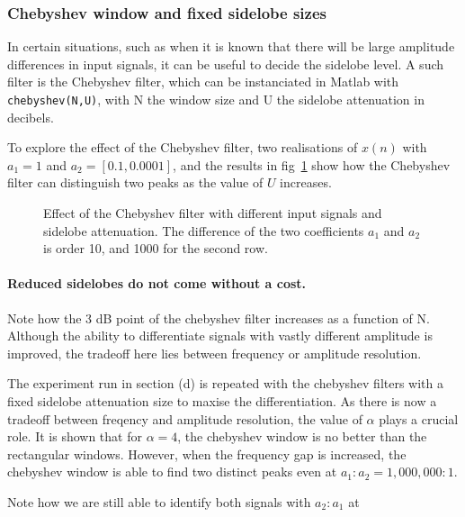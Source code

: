 \documentclass[main.tex]{subfiles}
\begin{document}
\subsubsection{Chebyshev window and fixed sidelobe sizes}

In certain situations, such as when it is known that there will be large amplitude differences in input signals, it can be useful to decide the sidelobe level. A such filter is the Chebyshev filter, which can be instanciated in Matlab with {\tt chebyshev(N,U)}, with N the window size and U the sidelobe attenuation in decibels.

To explore the effect of the Chebyshev filter, two realisations of $x(n)$ with $a_1 =1$ and $a_2=[0.1, 0.0001]$, and the results in fig~\ref{fig:q1_3_f} show how the Chebyshev filter can distinguish two peaks as the value of $U$ increases.

\begin{figure}[H]
	\centering 
	\resizebox{\textwidth}{!}{}
	\caption{Effect of the Chebyshev filter with different input signals and sidelobe attenuation. The difference of the two coefficients $a_1$ and $a_2$ is order 10, and 1000 for the second row.}
	\label{fig:q1_3_f}
\end{figure}

\paragraph{Reduced sidelobes do not come without a cost.} Note how the 3 dB point of the chebyshev filter increases as a function of N. Although the ability to differentiate signals with vastly different amplitude is improved, the tradeoff here lies between frequency or amplitude resolution.


The experiment run in section (d) is repeated with the chebyshev filters with a fixed sidelobe attenuation size to maxise the differentiation. As there is now a tradeoff between freqency and amplitude resolution, the value of $\alpha$ plays a crucial role. It is shown that for $\alpha = 4$, the chebyshev window is no better than the rectangular windows. However, when the frequency gap is increased, the chebyshev window is able to find two distinct peaks even at $a_1:a_2 = 1,000,000:1$.

Note how we are still able to identify both signals with $a_2:a_1$ at %
\end{document}
